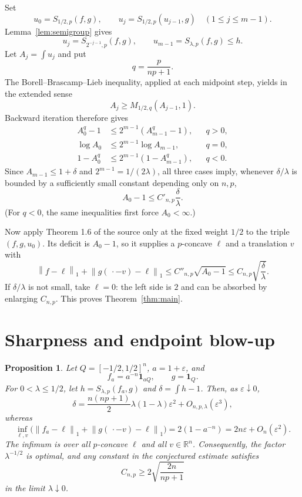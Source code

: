 \documentclass[11pt]{article}
\newtheorem{proposition}[theorem]{Proposition}
\theoremstyle{remark}
\newcommand{\R}{\mathbb{R}}
\newcommand{\one}{\mathbf{1}}
\newcommand{\norm}[1]{\left\lVert#1\right\rVert_{1}}
\begin{document}
Set
\[
 u_0=S_{1/2,p}(f,g),\qquad
 u_j=S_{1/2,p}(u_{j-1},g)\quad(1\leq j\leq m-1).
\]
Lemma~\ref{lem:semigroup} gives
\[
 u_j=S_{2^{-j-1},p}(f,g),
 \qquad u_{m-1}=S_{\lambda,p}(f,g)\leq h.
\]
Let $A_j=\int u_j$ and put
\[
 q=\frac{p}{np+1}.
\]
The Borell--Brascamp--Lieb inequality, applied at each midpoint step, yields
in the extended sense
\[
 A_j\geq M_{1/2,q}(A_{j-1},1).
\]
Backward iteration therefore gives
\begin{align*}
 A_0^q-1
 &\leq 2^{m-1}(A_{m-1}^q-1),&&q>0,\\
 \log A_0
 &\leq 2^{m-1}\log A_{m-1},&&q=0,\\
 1-A_0^q
 &\leq 2^{m-1}(1-A_{m-1}^q),&&q<0.
\end{align*}
Since $A_{m-1}\leq1+\delta$ and $2^{m-1}=1/(2\lambda)$, all three cases
imply, whenever $\delta/\lambda$ is bounded by a sufficiently small constant
depending only on $n,p$,
\[
 A_0-1\leq C'_{n,p}\frac{\delta}{\lambda}.
\]
(For $q<0$, the same inequalities first force $A_0<\infty$.)

Now apply Theorem 1.6 of the source only at the fixed weight $1/2$ to the
triple $(f,g,u_0)$.  Its deficit is $A_0-1$, so it supplies a $p$-concave
$\ell$ and a translation $v$ with
\[
 \norm{f-\ell}+\norm{g(\,\cdot-v)-\ell}
 \leq C''_{n,p}\sqrt{A_0-1}
 \leq C_{n,p}\sqrt{\frac{\delta}{\lambda}}.
\]
If $\delta/\lambda$ is not small, take $\ell=0$: the left side is $2$ and
can be absorbed by enlarging $C_{n,p}$.  This proves
Theorem~\ref{thm:main}.

\section{Sharpness and endpoint blow-up}

\begin{proposition}\label{prop:sharp}
Let $Q=[-1/2,1/2]^n$, $a=1+\varepsilon$, and
\[
 f_a=a^{-n}\one_{aQ},\qquad g=\one_Q.
\]
For $0<\lambda\leq1/2$, let $h=S_{\lambda,p}(f_a,g)$ and
$\delta=\int h-1$.  Then, as $\varepsilon\downarrow0$,
\[
 \delta=\frac{n(np+1)}2\lambda(1-\lambda)\varepsilon^2
        +O_{n,p,\lambda}(\varepsilon^3),
\]
whereas
\[
 \inf_{\ell,v}
 \bigl(\norm{f_a-\ell}+\norm{g(\,\cdot-v)-\ell}\bigr)
 =2(1-a^{-n})=2n\varepsilon+O_n(\varepsilon^2).
\]
The infimum is over all $p$-concave $\ell$ and all $v\in\R^n$.
Consequently, the factor $\lambda^{-1/2}$ is optimal, and any constant in
the conjectured estimate satisfies
\[
 C_{n,p}\geq 2\sqrt{\frac{2n}{np+1}}
\]
in the limit $\lambda\downarrow0$.
\end{proposition}
\end{document}
